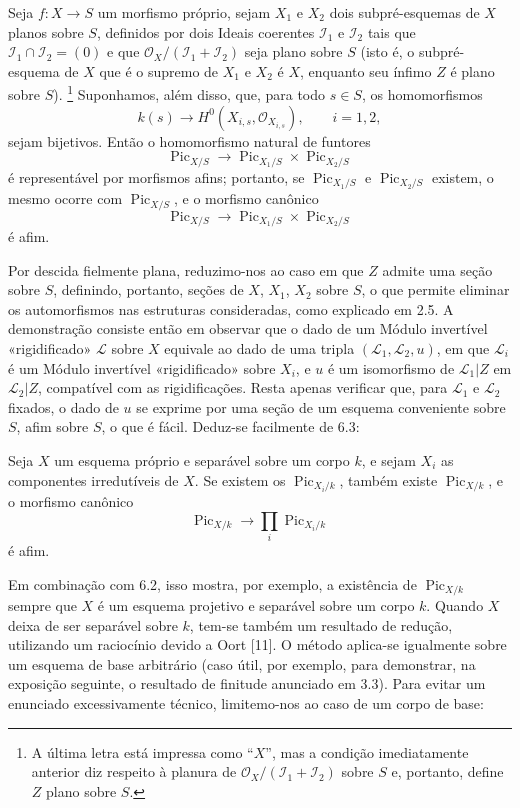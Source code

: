  Seja $f:X\longrightarrow S$ um morfismo próprio, sejam
$X_1$ e $X_2$ dois subpré-esquemas de $X$ planos sobre $S$, definidos por dois
Ideais coerentes $\mathcal I_1$ e $\mathcal I_2$ tais que
$\mathcal I_1\cap\mathcal I_2=(0)$ e que
$\mathcal O_X/(\mathcal I_1+\mathcal I_2)$ seja plano sobre $S$ (isto é, o
subpré-esquema de $X$ que é o supremo de $X_1$ e $X_2$ é $X$, enquanto seu ínfimo $Z$
é plano sobre $S$).
\footnote{A última letra está impressa como ``$X$'', mas a condição
imediatamente anterior diz respeito à planura de
$\mathcal O_X/(\mathcal I_1+\mathcal I_2)$ sobre $S$ e, portanto, define $Z$
plano sobre $S$.} Suponhamos, além disso, que, para todo $s\in S$, os
homomorfismos
\[
k(s)\longrightarrow H^0(X_{i,s},\mathcal O_{X_{i,s}}),\qquad i=1,2,
\]
sejam bijetivos. Então o homomorfismo natural de funtores
\[
\operatorname{Pic}_{X/S}\longrightarrow
\operatorname{Pic}_{X_1/S}\times\operatorname{Pic}_{X_2/S}
\]
é representável por morfismos afins; portanto, se
$\operatorname{Pic}_{X_1/S}$ e $\operatorname{Pic}_{X_2/S}$ existem, o mesmo
ocorre com $\operatorname{Pic}_{X/S}$, e o morfismo canônico
\[
\operatorname{Pic}_{X/S}\longrightarrow
\operatorname{Pic}_{X_1/S}\times\operatorname{Pic}_{X_2/S}
\]
é afim.

Por descida fielmente plana, reduzimo-nos ao caso em que $Z$ admite uma seção
sobre $S$, definindo, portanto, seções de $X$, $X_1$, $X_2$ sobre $S$, o que
permite eliminar os automorfismos nas estruturas consideradas, como explicado
em 2.5. A demonstração consiste então em observar que o dado de um Módulo
invertível
«rigidificado» $\mathcal L$ sobre $X$ equivale ao dado de uma tripla
$(\mathcal L_1,\mathcal L_2,u)$, em que $\mathcal L_i$ é um Módulo invertível
«rigidificado» sobre $X_i$, e $u$ é um isomorfismo de
$\mathcal L_1|Z$ em $\mathcal L_2|Z$, compatível com as rigidificações.
Resta apenas verificar que, para $\mathcal L_1$ e $\mathcal L_2$ fixados, o
dado de $u$ se exprime por uma seção de um esquema conveniente sobre $S$, afim
sobre $S$, o que é fácil. Deduz-se facilmente de 6.3:

 Seja $X$ um esquema próprio e separável sobre um corpo
$k$, e sejam $X_i$ as componentes irredutíveis de $X$. Se existem os
$\operatorname{Pic}_{X_i/k}$, também existe $\operatorname{Pic}_{X/k}$, e o
morfismo canônico
\[
\operatorname{Pic}_{X/k}\longrightarrow\prod_i\operatorname{Pic}_{X_i/k}
\]
é afim.

Em combinação com 6.2, isso mostra, por exemplo, a existência de
$\operatorname{Pic}_{X/k}$ sempre que $X$ é um esquema projetivo e separável
sobre um corpo $k$. Quando $X$ deixa de ser separável sobre $k$, tem-se também
um resultado de redução, utilizando um raciocínio devido a Oort [11]. O método
aplica-se igualmente sobre um esquema de base arbitrário (caso útil, por
exemplo, para demonstrar, na exposição seguinte, o resultado de finitude
anunciado em 3.3). Para evitar um enunciado excessivamente técnico,
limitemo-nos ao caso de um corpo de base:

